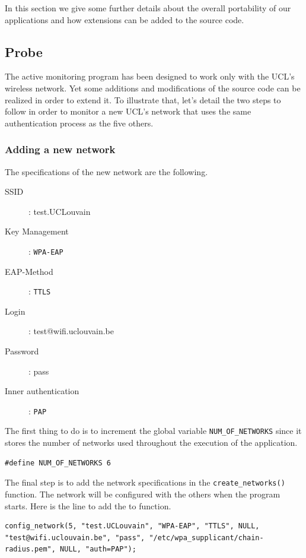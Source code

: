 In this section we give some further details about the overall portability of our applications and how extensions can be added to the source code.

\subsection{Probe}
The active monitoring program has been designed to work only with the UCL's wireless network. Yet some additions and modifications of the source code can be realized in order to extend it. To illustrate that, let's detail the two steps to follow in order to monitor a new UCL's network that uses the same authentication process as the five others.

\subsubsection{Adding a new network}
The specifications of the new network are the following.

\begin{description}
	\item [SSID]: test.UCLouvain
	\item [Key Management]: \texttt{WPA-EAP}
	\item [EAP-Method]: \texttt{TTLS}
	\item [Login]: test@wifi.uclouvain.be
	\item [Password]: pass
	\item [Inner authentication]: \texttt{PAP}
\end{description}

The first thing to do is to increment the global variable \texttt{NUM\_OF\_NETWORKS} since it stores the number of networks used throughout the execution of the application.\\

\begin{lstlisting}[frame=single,breaklines=true,caption={Small log file example}]
#define NUM_OF_NETWORKS 6
\end{lstlisting}

The final step is to add the network specifications in the \texttt{create\_networks()} function. The network will be configured with the others when the program starts. Here is the line to add the to function.\\

\begin{lstlisting}[frame=single,breaklines=true,caption={Small log file example}]
config_network(5, "test.UCLouvain", "WPA-EAP", "TTLS", NULL, "test@wifi.uclouvain.be", "pass", "/etc/wpa_supplicant/chain-radius.pem", NULL, "auth=PAP");
\end{lstlisting}


